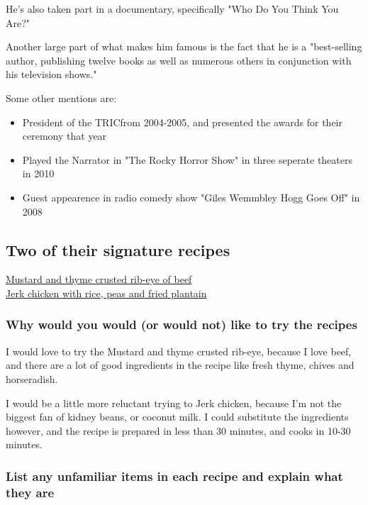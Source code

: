 \documentclass[11pt]{article}
\begin{document}
He's also taken part in a documentary, specifically "Who Do You Think You Are?" 

Another large part of what makes him famous is the fact that he is a "best-selling author, publishing twelve books as well as numerous others in conjunction with his television shows."\cite{wikipedia} 

\newpage

Some other mentions are: 
\begin{itemize}
\item President of the TRIC\footnotemark from 2004-2005, and presented the awards for their ceremony that year
\item Played the Narrator in "The Rocky Horror Show" in three seperate theaters in 2010
\item Guest appearence in radio comedy show "Giles Wemmbley Hogg Goes Off" in 2008
\end{itemize}


\subsection*{Two of their signature recipes}
\label{sec:org56d279d}

\href{http://www.bbc.co.uk/food/recipes/\_81487}{Mustard and thyme crusted rib-eye of beef}\\
\href{http://www.bbc.co.uk/food/recipes/caribbeanjerkchicken\_86981}{Jerk chicken with rice, peas and fried plantain}

\subsubsection*{Why would you would (or would not) like to try the recipes}
\label{sec:org34da339}

I would love to try the Mustard and thyme crusted rib-eye, because I love beef, and there are a lot of good ingredients in the recipe like fresh thyme, chives and horseradish.

I would be a little more reluctant trying to Jerk chicken, because I'm not the biggest fan of kidney beans, or coconut milk. I could substitute the ingredients however, and the recipe is prepared in less than 30 minutes, and cooks in 10-30 minutes. 

\subsubsection*{List any unfamiliar items in each recipe and explain what they are}
\label{sec:org1cd5db5}
\end{document}
